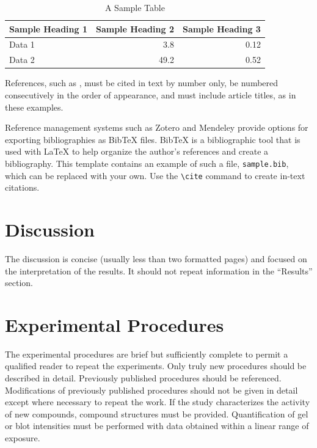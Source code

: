 \documentclass{jbc-article}
\begin{document}
\begin{article}
\begin{table}[hp!]\centering
\begin{tabular}{l r r}
Sample Heading 1 & Sample Heading 2 & Sample Heading 3\\
\hline
Data 1 & 3.8 & 0.12 \\
Data 2 & 49.2 & 0.52
\end{tabular}
\caption{A Sample Table}
\label{tab:sample}
\end{table}

References, such as \cite{macdonald1995difference,sambrook1989molecular,waskiewicz1997mitogen,back:etal:2017}, must be cited in text by number only, be numbered consecutively in the order of appearance, and must include article titles, as in these examples. 

Reference management systems such as Zotero and Mendeley provide options for exporting bibliographies as Bib\TeX{} files. Bib\TeX{} is a bibliographic tool that is used with \LaTeX{} to help organize the author's references and create a bibliography. This template contains an example of such a file, \texttt{sample.bib}, which can be replaced with your own. Use the \verb|\cite| command  to create in-text citations.

\section{Discussion}

The discussion is concise (usually less than two formatted pages) and focused on the interpretation of the results. It should not repeat information in the ``Results'' section.

\section{Experimental Procedures}

The experimental procedures are brief but sufficiently complete to permit a qualified reader to repeat the experiments. Only truly new procedures should be described in detail. Previously published procedures should be referenced. Modifications of previously published procedures should not be given in detail except where necessary to repeat the work. If the study characterizes the activity of new compounds, compound structures must be provided. Quantification of gel or blot intensities must be performed with data obtained within a linear range of exposure.

\end{article}
\end{document}

